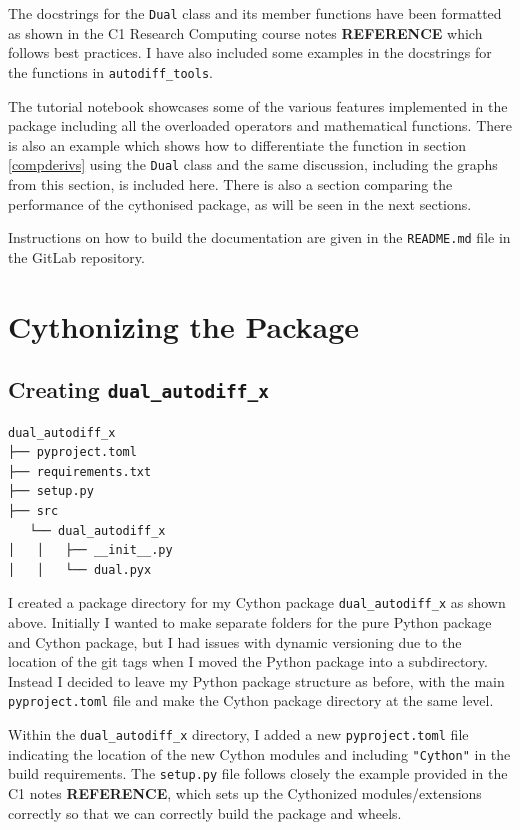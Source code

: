 \documentclass{article}
\begin{document}
The docstrings for the \texttt{Dual} class and its member functions have been formatted as shown in the C1 Research Computing course notes \textbf{REFERENCE} which follows best practices. I have also included some examples in the docstrings for the functions in \texttt{autodiff\_tools}. 

The tutorial notebook showcases some of the various features implemented in the package including all the overloaded operators and mathematical functions. There is also an example which shows how to differentiate the function in section \ref{compderivs} using the \texttt{Dual} class and the same discussion, including the graphs from this section, is included here. There is also a section comparing the performance of the cythonised package, as will be seen in 
the next sections.

Instructions on how to build the documentation are given in the \texttt{README.md} file in the GitLab repository. 

\section{Cythonizing the Package}

\subsection{Creating \texttt{dual\_autodiff\_x}}
\begin{lstlisting}
dual_autodiff_x
├── pyproject.toml
├── requirements.txt
├── setup.py
├── src
   └── dual_autodiff_x
│   │   ├── __init__.py
│   │   └── dual.pyx

\end{lstlisting}

I created a package directory for my Cython package \texttt{dual\_autodiff\_x} as shown above. Initially I wanted to make separate folders for the pure Python package and Cython package, but I had issues with dynamic versioning due to the location of the git tags when I moved the Python package into a subdirectory. Instead I decided to leave my Python package structure as before, with the main \texttt{pyproject.toml} file and make the Cython package directory at the same level. 

Within the \texttt{dual\_autodiff\_x} directory, I added a new \texttt{pyproject.toml} file indicating the location of the new Cython modules and including \texttt{"Cython"} in the build requirements. The \texttt{setup.py} file follows closely the example provided in the C1 notes \textbf{REFERENCE}, which sets up the Cythonized modules/extensions correctly so that we can correctly build the package and wheels.
\end{document}
